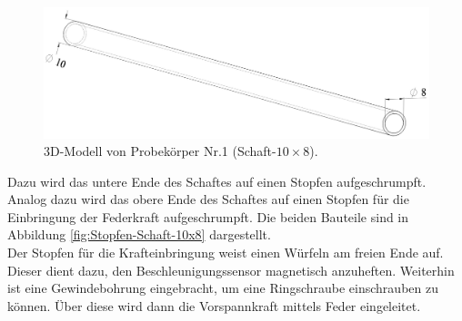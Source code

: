 	\begin{figure}[H]
		\centering
		\includegraphics[width=0.9\linewidth, height=0.25\textheight]{Experimentelle_Untersuchungen/Schaft_10x8}
		\caption{3D-Modell von Probekörper Nr.1  (Schaft-$ 10\times8 $).}
		\label{fig:Schaft-10x8}
	\end{figure}

	Dazu wird das untere Ende des Schaftes auf einen Stopfen aufgeschrumpft. Analog dazu wird das obere Ende des Schaftes auf einen Stopfen für die Einbringung der Federkraft aufgeschrumpft. Die beiden Bauteile sind in Abbildung  \ref{fig:Stopfen-Schaft-10x8} dargestellt. \\
	
	Der Stopfen für die Krafteinbringung weist einen Würfeln am freien Ende auf. Dieser dient dazu, den Beschleunigungssensor magnetisch anzuheften. Weiterhin ist eine Gewindebohrung eingebracht, um eine Ringschraube einschrauben zu können. Über diese wird dann die Vorspannkraft mittels Feder eingeleitet. 
	
	
	
